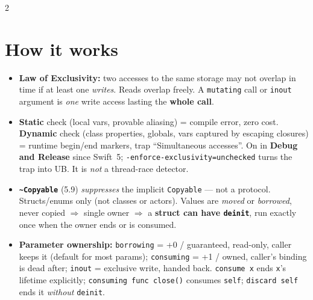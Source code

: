 \documentclass[8pt]{extarticle}
\begin{document}


\begin{multicols}{2}
\raggedright

\section{How it works}
\begin{itemize}
  \item \textbf{Law of Exclusivity:} two accesses to the same storage may not
        overlap in time if at least one \emph{writes}. Reads overlap freely.
        A \texttt{mutating} call or \texttt{inout} argument is \emph{one}
        write access lasting the \textbf{whole call}.
  \item \textbf{Static} check (local vars, provable aliasing) = compile error,
        zero cost. \textbf{Dynamic} check (class properties, globals, vars
        captured by escaping closures) = runtime begin/end markers, trap
        ``Simultaneous accesses''. On in \textbf{Debug and Release} since Swift~5;
        \texttt{-enforce-exclusivity=unchecked} turns the trap into UB.
        It is \emph{not} a thread-race detector.
  \item \textbf{\texttt{\textasciitilde Copyable}} (5.9) \emph{suppresses} the implicit
        \texttt{Copyable} — not a protocol. Structs/enums only (not classes or
        actors). Values are \emph{moved} or \emph{borrowed}, never copied
        $\Rightarrow$ single owner $\Rightarrow$ a \textbf{struct can have
        \texttt{deinit}}, run exactly once when the owner ends or is consumed.
  \item \textbf{Parameter ownership:} \texttt{borrowing} = +0 / guaranteed,
        read-only, caller keeps it (default for most params);
        \texttt{consuming} = +1 / owned, caller's binding is dead after;
        \texttt{inout} = exclusive write, handed back.
        \texttt{consume x} ends \texttt{x}'s lifetime explicitly;
        \texttt{consuming func close()} consumes \texttt{self};
        \texttt{discard self} ends it \emph{without} \texttt{deinit}.

\end{itemize}
\end{multicols}
\end{document}
